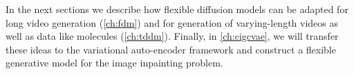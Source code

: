 In the next sections we describe how flexible diffusion models can be adapted for long video generation (\cref{ch:fdm}) and for generation of varying-length videos as well as data like molecules (\cref{ch:tddm}). Finally, in \cref{ch:cigcvae}, we will transfer these ideas to the variational auto-encoder framework and construct a  flexible generative model for the image inpainting problem.
